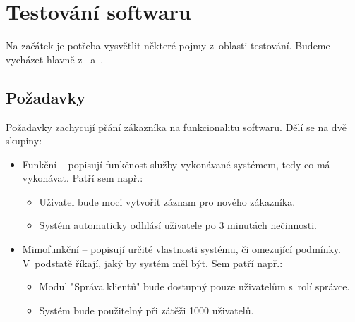 \chapter{Testování softwaru}



Na začátek je potřeba vysvětlit některé pojmy z~oblasti testování. Budeme vycházet hlavně z~\citep{RizeniKvalitySW} a~\citep{Patton}.

	\section{Požadavky}
	Požadavky zachycují přání zákazníka na funkcionalitu softwaru. Dělí se na dvě skupiny:
		\begin{itemize}
			\item Funkční -- popisují funkčnost služby vykonávané systémem, tedy co má vykonávat. Patří sem např.:
				\begin{itemize}
					\item Uživatel bude moci vytvořit záznam pro nového zákazníka.
					\item Systém automaticky odhlásí uživatele po 3 minutách nečinnosti.
				\end{itemize}
			\item Mimofunkční -- popisují určité vlastnosti systému, či omezující podmínky. V~podstatě říkají, jaký by systém měl být. Sem patří např.:
				\begin{itemize}
					\item Modul "Správa klientů" bude dostupný pouze uživatelům s~rolí správce.
					\item Systém bude použitelný při zátěži 1000 uživatelů.
				\end{itemize}
		\end{itemize}
	
